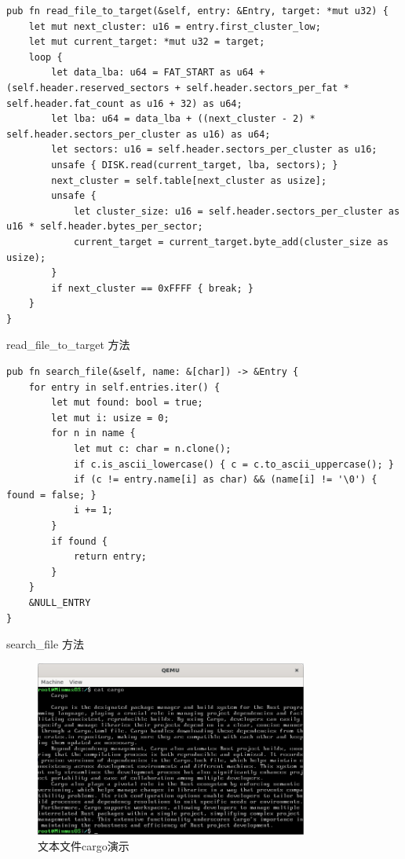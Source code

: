 \begin{listing}[htbp]
    \begin{verbatim}
pub fn read_file_to_target(&self, entry: &Entry, target: *mut u32) {
    let mut next_cluster: u16 = entry.first_cluster_low;
    let mut current_target: *mut u32 = target;
    loop {
        let data_lba: u64 = FAT_START as u64 + (self.header.reserved_sectors + self.header.sectors_per_fat * self.header.fat_count as u16 + 32) as u64;
        let lba: u64 = data_lba + ((next_cluster - 2) * self.header.sectors_per_cluster as u16) as u64;
        let sectors: u16 = self.header.sectors_per_cluster as u16;
        unsafe { DISK.read(current_target, lba, sectors); }
        next_cluster = self.table[next_cluster as usize];
        unsafe {
            let cluster_size: u16 = self.header.sectors_per_cluster as u16 * self.header.bytes_per_sector;
            current_target = current_target.byte_add(cluster_size as usize);
        }
        if next_cluster == 0xFFFF { break; }
    }
}
    \end{verbatim}
    \caption{read\_file\_to\_target 方法}\label{lst:ReadFileToTargetMethod}
\end{listing}

\begin{listing}[htbp]
    \begin{verbatim}
pub fn search_file(&self, name: &[char]) -> &Entry {
    for entry in self.entries.iter() {
        let mut found: bool = true;
        let mut i: usize = 0;
        for n in name {
            let mut c: char = n.clone();
            if c.is_ascii_lowercase() { c = c.to_ascii_uppercase(); }
            if (c != entry.name[i] as char) && (name[i] != '\0') { found = false; }
            i += 1;
        }
        if found {
            return entry;
        }
    }
    &NULL_ENTRY
}
    \end{verbatim}
    \caption{search\_file 方法}\label{lst:SearchFileMethod}
\end{listing}

\begin{figure}[htbp]
    \centering
    \includegraphics[width=0.8\textwidth]{figures/CargoFilePresentation.png}
    \caption{文本文件cargo演示}
    \label{fig:CargoFilePresentation}
\end{figure}

